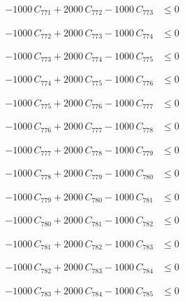 \documentclass[a4paper,11pt]{article}
\begin{document}
\begin{align}
-1000\,C_{771} + 2000\,C_{772} - 1000\,C_{773} &\leq 0 \nonumber
\end{align}

\begin{align}
-1000\,C_{772} + 2000\,C_{773} - 1000\,C_{774} &\leq 0 \nonumber
\end{align}

\begin{align}
-1000\,C_{773} + 2000\,C_{774} - 1000\,C_{775} &\leq 0 \nonumber
\end{align}

\begin{align}
-1000\,C_{774} + 2000\,C_{775} - 1000\,C_{776} &\leq 0 \nonumber
\end{align}

\begin{align}
-1000\,C_{775} + 2000\,C_{776} - 1000\,C_{777} &\leq 0 \nonumber
\end{align}

\begin{align}
-1000\,C_{776} + 2000\,C_{777} - 1000\,C_{778} &\leq 0 \nonumber
\end{align}

\begin{align}
-1000\,C_{777} + 2000\,C_{778} - 1000\,C_{779} &\leq 0 \nonumber
\end{align}

\begin{align}
-1000\,C_{778} + 2000\,C_{779} - 1000\,C_{780} &\leq 0 \nonumber
\end{align}

\begin{align}
-1000\,C_{779} + 2000\,C_{780} - 1000\,C_{781} &\leq 0 \nonumber
\end{align}

\begin{align}
-1000\,C_{780} + 2000\,C_{781} - 1000\,C_{782} &\leq 0 \nonumber
\end{align}

\begin{align}
-1000\,C_{781} + 2000\,C_{782} - 1000\,C_{783} &\leq 0 \nonumber
\end{align}

\begin{align}
-1000\,C_{782} + 2000\,C_{783} - 1000\,C_{784} &\leq 0 \nonumber
\end{align}

\begin{align}
-1000\,C_{783} + 2000\,C_{784} - 1000\,C_{785} &\leq 0 \nonumber
\end{align}
\end{document}
